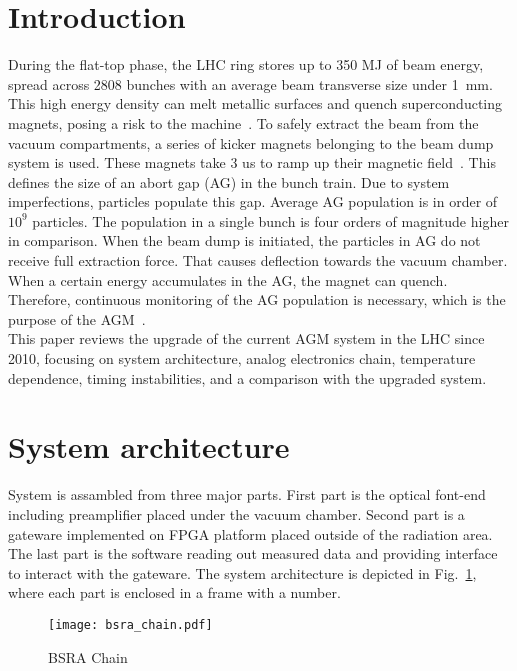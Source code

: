 \section{Introduction}
During the flat-top phase, the LHC ring stores up to 350 MJ of beam energy,
spread across 2808 bunches with an average beam transverse size under
\SI{1}{mm}. This high energy density can melt metallic surfaces and quench
superconducting magnets, posing a risk to the machine~\cite{LHC_report}. 
To safely extract the beam from the vacuum compartments, a series of kicker
magnets belonging to the beam dump system is used. These magnets take 3 us to
ramp up their magnetic field~\cite{beam_dump_system}. This defines the size of
an abort gap (AG) in the bunch train. Due to system imperfections, particles
populate this gap. Average AG population is in order of $10^{9}$ particles. The
population in a single bunch is four orders of magnitude higher in comparison.
When the beam dump is initiated, the particles in AG do not receive full
extraction force. That causes deflection towards the vacuum chamber. When a
certain energy accumulates in the AG, the magnet can quench. Therefore,
continuous monitoring of the AG population is necessary, which is the purpose
of the AGM~\cite{particles_in_ag}.\\
This paper reviews the upgrade of the current AGM system in the LHC since 2010,
focusing on system architecture, analog electronics chain, temperature
dependence, timing instabilities, and a comparison with the upgraded system.

\section{System architecture}
System is assambled from three major parts. First part is the optical font-end
including preamplifier placed under the vacuum chamber. Second part is a
gateware implemented on FPGA platform placed outside of the radiation area. The
last part is the software reading out measured data and providing interface to
interact with the gateware. The system architecture is depicted in
Fig.~\ref{fig:bsra_chain}, where each part is enclosed in a frame with a
number.
\begin{figure}[!tbh]
    \centering
    \texttt{[image: bsra\_chain.pdf]}
    \caption{BSRA Chain}
    \label{fig:bsra_chain}
\end{figure}

